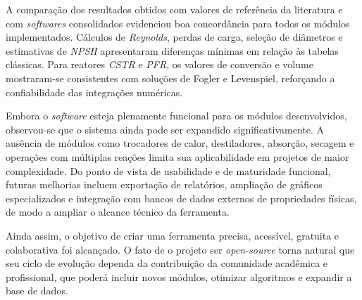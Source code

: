 A comparação dos resultados obtidos com valores de referência da literatura e com \textit{softwares} consolidados evidenciou boa concordância para todos os módulos implementados. Cálculos de \textit{Reynolds}, perdas de carga, seleção de diâmetros e estimativas de \textit{NPSH} apresentaram diferenças mínimas em relação às tabelas clássicas. Para reatores \textit{CSTR} e \textit{PFR}, os valores de conversão e volume mostraram-se consistentes com soluções de Fogler e Levenspiel, reforçando a confiabilidade das integrações numéricas.

Embora o \textit{software} esteja plenamente funcional para os módulos desenvolvidos, observou-se que o sistema ainda pode ser expandido significativamente. A ausência de módulos como trocadores de calor, destiladores, absorção, secagem e operações com múltiplas reações limita sua aplicabilidade em projetos de maior complexidade. Do ponto de vista de usabilidade e de maturidade funcional, futuras melhorias incluem exportação de relatórios, ampliação de gráficos especializados e integração com bancos de dados externos de propriedades físicas, de modo a ampliar o alcance técnico da ferramenta.

Ainda assim, o objetivo de criar uma ferramenta precisa, acessível, gratuita e colaborativa foi alcançado. O fato de o projeto ser \textit{open-source} torna natural que seu ciclo de evolução dependa da contribuição da comunidade acadêmica e profissional, que poderá incluir novos módulos, otimizar algoritmos e expandir a base de dados.
